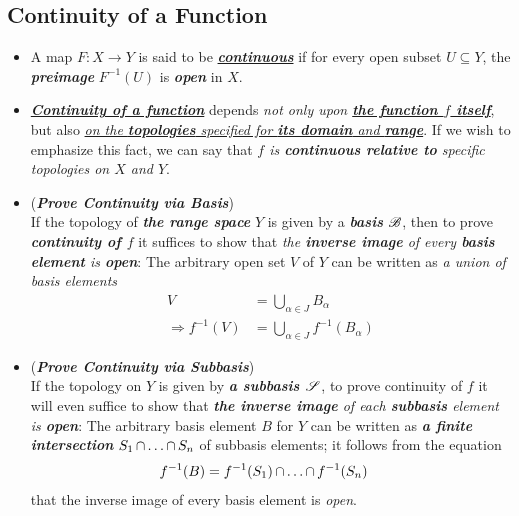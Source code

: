 \documentclass[11pt]{article}
\begin{document}
\subsection{Continuity of a Function}
\begin{itemize}
\item \begin{definition}
A map $F: X \rightarrow Y$ is said to be \underline{\emph{\textbf{continuous}}} if for every open subset $U \subseteq Y$, the \emph{\textbf{preimage}} $F^{-1}(U)$ is \emph{\textbf{open}} in $X$.
\end{definition}

\item \begin{remark}
\underline{\emph{\textbf{Continuity of a function}}} depends \emph{not only upon \underline{\textbf{the function $f$ itself}}}, but also \underline{\emph{on the \textbf{topologies} specified for \textbf{its domain} and \textbf{range}}}. If we wish to emphasize this fact, we can say that \emph{$f$ is \textbf{continuous relative to} specific topologies on $X$ and $Y$}.
\end{remark}

\item \begin{remark} (\emph{\textbf{Prove Continuity via Basis}})\\
If the topology of \emph{\textbf{the range space}} $Y$ is given by a \emph{\textbf{basis}} ${\mathscr B}$, then to prove \emph{\textbf{continuity of $f$}} it suffices to show that \emph{the \textbf{inverse image} of every \textbf{basis element} is \textbf{open}}: The arbitrary open set $V$ of $Y$ can be written as \emph{a union of basis elements}
\begin{align*}
V &= \bigcup_{\alpha \in J}B_{\alpha}\\
\Rightarrow f^{-1}(V) &= \bigcup_{\alpha \in J}f^{-1}(B_{\alpha})
\end{align*}
\end{remark}

\item \begin{remark} (\emph{\textbf{Prove Continuity via Subbasis}})\\
If the topology on $Y$ is given by \emph{\textbf{a subbasis ${\mathscr S}$}}, to prove continuity of $f$ it will even suffice to show that \emph{\textbf{the inverse image} of each \textbf{subbasis} element is \textbf{open}}: The arbitrary basis element $B$ for $Y$ can be written as \emph{\textbf{a finite intersection}} $S_1 \,{\cap}\ldots{\cap}\, S_{n}$ of subbasis elements; it follows from the equation
\begin{align*}
f^{-1}(B) &= f^{-1}(S_1) \,{\cap}\ldots{\cap}\, f^{-1}(S_n)
\end{align*}
that the inverse image of every basis element is \emph{open}.
\end{remark}


\end{itemize}
\end{document}
